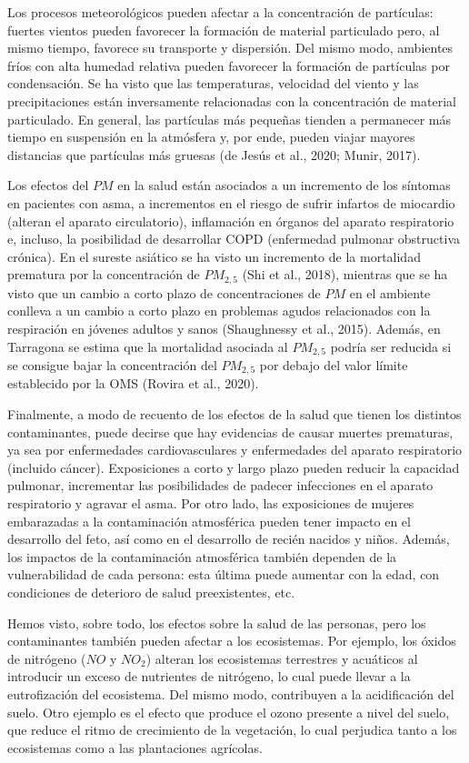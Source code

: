 \documentclass[12pt]{article}
\begin{document}
Los procesos meteorológicos pueden afectar a la concentración de partículas: fuertes vientos pueden favorecer la formación de material particulado pero, al mismo tiempo, favorece su transporte y dispersión. Del mismo modo, ambientes fríos con alta humedad relativa pueden favorecer la formación de partículas por condensación. Se ha visto que las temperaturas, velocidad del viento y las precipitaciones están inversamente relacionadas con la concentración de material particulado. En general, las partículas más pequeñas tienden a permanecer más tiempo en suspensión en la atmósfera y, por ende, pueden viajar mayores distancias que partículas más gruesas (de Jesús et al., 2020; Munir, 2017).

Los efectos del $PM$ en la salud están asociados a un incremento de los síntomas en pacientes con asma, a incrementos en el riesgo de sufrir infartos de miocardio (alteran el aparato circulatorio), inflamación en órganos del aparato respiratorio e, incluso, la posibilidad de desarrollar COPD (enfermedad pulmonar obstructiva crónica). En el sureste asiático se ha visto un incremento de la mortalidad prematura por la concentración de $PM_{2,5}$ (Shi et al., 2018), mientras que se ha visto que un cambio a corto plazo de concentraciones de $PM$ en el ambiente conlleva a un cambio a corto plazo en problemas agudos relacionados con la respiración en jóvenes adultos y sanos (Shaughnessy et al., 2015). Además, en Tarragona se estima que la mortalidad asociada al $PM_{2,5}$ podría ser reducida si se consigue bajar la concentración del $PM_{2,5}$ por debajo del valor límite establecido por la OMS (Rovira et al., 2020).

Finalmente, a modo de recuento de los efectos de la salud que tienen los distintos contaminantes, puede decirse que hay evidencias de causar muertes prematuras, ya sea por enfermedades cardiovasculares y enfermedades del aparato respiratorio (incluido cáncer). Exposiciones a corto y largo plazo pueden reducir la capacidad pulmonar, incrementar las posibilidades de padecer infecciones en el aparato respiratorio y agravar el asma. Por otro lado, las exposiciones de mujeres embarazadas a la contaminación atmosférica pueden tener impacto en el desarrollo del feto, así como en el desarrollo de recién nacidos y niños. Además, los impactos de la contaminación atmosférica también dependen de la vulnerabilidad de cada persona: esta última puede aumentar con la edad, con condiciones de deterioro de salud preexistentes, etc.

Hemos visto, sobre todo, los efectos sobre la salud de las personas, pero los contaminantes también pueden afectar a los ecosistemas. Por ejemplo, los óxidos de nitrógeno ($NO$ y $NO_2$) alteran los ecosistemas terrestres y acuáticos al introducir un exceso de nutrientes de nitrógeno, lo cual puede llevar a la eutrofización del ecosistema. Del mismo modo, contribuyen a la acidificación del suelo. Otro ejemplo es el efecto que produce el ozono presente a nivel del suelo, que reduce el ritmo de crecimiento de la vegetación, lo cual perjudica tanto a los ecosistemas como a las plantaciones agrícolas.
\end{document}
